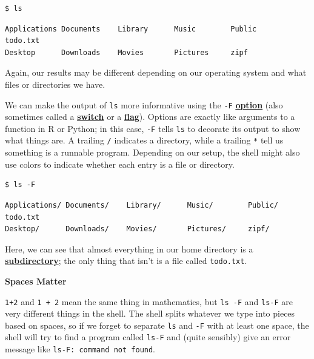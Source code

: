 \documentclass[
]{krantz}
\renewenvironment{quote}{\begin{VF}}{\end{VF}}
\newcommand{\gref}[2]{\hyperlink{#2}{\textbf{#1}}}
\begin{document}
\begin{verbatim}
$ ls
\end{verbatim}

\begin{verbatim}
Applications Documents    Library      Music        Public         todo.txt
Desktop      Downloads    Movies       Pictures     zipf
\end{verbatim}

Again,
our results may be different depending on our operating system
and what files or directories we have.

We can make the output of \texttt{ls} more informative using the \texttt{-F} \gref{option}{command\_line\_option}
(also sometimes called a \gref{switch}{command\_line\_switch} or a \gref{flag}{command\_line\_flag}).
Options are exactly like arguments to a function in R or Python;
in this case,
\texttt{-F} tells \texttt{ls} to decorate its output to show what things are.
A trailing \texttt{/} indicates a directory,
while a trailing \texttt{*} tell us something is a runnable program.
Depending on our setup,
the shell might also use colors to indicate whether each entry is a file or directory.

\begin{verbatim}
$ ls -F
\end{verbatim}

\begin{verbatim}
Applications/ Documents/    Library/      Music/        Public/        todo.txt
Desktop/      Downloads/    Movies/       Pictures/     zipf/
\end{verbatim}

Here,
we can see that almost everything in our home directory is a \gref{subdirectory}{subdirectory};
the only thing that isn't is a file called \texttt{todo.txt}.

\begin{quote}
\textbf{Spaces Matter}

\texttt{1+2} and \texttt{1~+~2} mean the same thing in mathematics,
but \texttt{ls~-F} and \texttt{ls-F} are very different things in the shell.
The shell splits whatever we type into pieces based on spaces,
so if we forget to separate \texttt{ls} and \texttt{-F} with at least one space,
the shell will try to find a program called \texttt{ls-F} and (quite sensibly)
give an error message like \texttt{ls-F:\ command\ not\ found}.
\end{quote}
\end{document}

